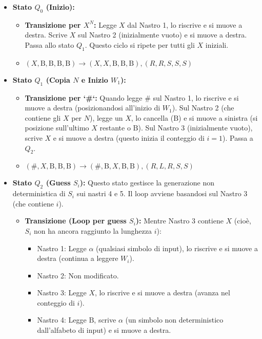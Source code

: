 \documentclass[a4paper]{article}
\newcommand{\B}{\text{B}} %
\newcommand{\alphaSym}{\alpha} %
\begin{document}
\begin{itemize}
    \item \textbf{Stato $Q_0$ (Inizio):}
        \begin{itemize}
            \item \textbf{Transizione per $X^N$:} Legge $X$ dal Nastro 1, lo riscrive e si muove a destra. Scrive $X$ sul Nastro 2 (inizialmente vuoto) e si muove a destra. Passa allo stato $Q_1$. Questo ciclo si ripete per tutti gli $X$ iniziali.
            \item $(X, \B, \B, \B, \B) \to (X, X, \B, \B, \B), (R,R,S,S,S)$
        \end{itemize}
    \item \textbf{Stato $Q_1$ (Copia $N$ e Inizio $W_1$):}
        \begin{itemize}
            \item \textbf{Transizione per `#`:} Quando legge $\#$ sul Nastro 1, lo riscrive e si muove a destra (posizionandosi all'inizio di $W_1$). Sul Nastro 2 (che contiene gli $X$ per $N$), legge un $X$, lo cancella ($\B$) e si muove a sinistra (si posizione sull'ultimo $X$ restante o $\B$). Sul Nastro 3 (inizialmente vuoto), scrive $X$ e si muove a destra (questo inizia il conteggio di $i=1$). Passa a $Q_2$.
            \item $(\#, X, \B, \B, \B) \to (\#, \B, X, \B, \B), (R,L,R,S,S)$
        \end{itemize}
    \item \textbf{Stato $Q_2$ (Guess $S_i$):}
        Questo stato gestisce la generazione non deterministica di $S_i$ sui nastri 4 e 5. Il loop avviene basandosi sul Nastro 3 (che contiene $i$).
        \begin{itemize}
            \item \textbf{Transizione (Loop per guess $S_i$):}
                Mentre Nastro 3 contiene $X$ (cioè, $S_i$ non ha ancora raggiunto la lunghezza $i$):
                \begin{itemize}
                    \item Nastro 1: Legge $\alpha$ (qualsiasi simbolo di input), lo riscrive e si muove a destra (continua a leggere $W_i$).
                    \item Nastro 2: Non modificato.
                    \item Nastro 3: Legge $X$, lo riscrive e si muove a destra (avanza nel conteggio di $i$).
                    \item Nastro 4: Legge $\B$, scrive $\alphaSym$ (un simbolo non deterministico dall'alfabeto di input) e si muove a destra.

\end{itemize}
\end{itemize}
\end{itemize}
\end{document}

